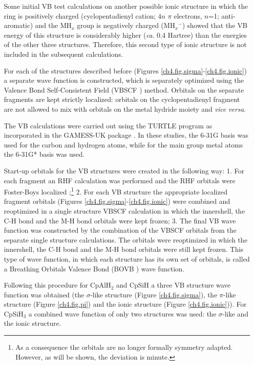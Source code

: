 Some initial VB test calculations on another possible ionic structure in which the ring is positively charged (cyclopentadienyl cation; $4n$ $\pi$ electrons, $n$=1; anti-aromatic) and the MH$_x$ group is negatively charged (MH${_x}{^-}$) showed that the VB energy of this structure is considerably higher (\textit{ca.} 0.4 Hartree) than the energies of the other three structures. Therefore, this second type of ionic structure is not included in the subsequent calculations.

For each of the structures described before (Figures \ref{ch4.fig.sigma}-\ref{ch4.fig.ionic}) a separate wave function is constructed, which is separately optimized using the Valence Bond Self-Consistent Field (VBSCF \cite{vbscf1,vbscf2}) method. Orbitals on the separate fragments are kept strictly localized: orbitals on the cyclopentadienyl fragment are not allowed to mix with orbitals on the metal hydride moiety and \textit{vice versa}.

The VB calculations were carried out using the \mbox{TURTLE} program \cite{turtle} as incorporated in the GAMESS-UK package \cite{gamess}. In these studies, the \mbox{6-31G} basis was used for the carbon and hydrogen atoms, while for the main group metal atoms the 6-31G* basis was used. 

Start-up orbitals for the VB structures were created in the following way: 1. For each fragment an RHF calculation was performed and the RHF orbitals were Foster-Boys localized \cite{foster};\footnote{\label{ch4.foot.consequence}As a consequence the orbitals are no longer formally symmetry adapted. However, as will be shown, the deviation is minute.} 2. For each VB structure the appropriate localized fragment orbitals (Figures \ref{ch4.fig.sigma}-\ref{ch4.fig.ionic}) were combined and reoptimized in a single structure VBSCF calculation in which the innershell, the C-H bond and the M-H bond orbitals were kept frozen; 3. The final VB wave function was constructed by the combination of the VBSCF orbitals from the separate single structure calculations. The orbitals were reoptimized in which the innershell, the C-H bond and the M-H bond orbitals were still kept frozen. This type of wave function, in which each structure has its own set of orbitals, is called a Breathing Orbitals Valence Bond (BOVB \cite{bovb1,bovb2}) wave function. 

Following this procedure  for CpAlH$_2$ and CpSiH a three VB structure wave function was obtained (the $\sigma$-like structure (Figure \ref{ch4.fig.sigma}), the $\pi$-like structure (Figure \ref{ch4.fig.pi}) and the ionic structure (Figure \ref{ch4.fig.ionic})). For CpSiH$_3$ a combined wave function of only two structures was used: the $\sigma$-like and the ionic structure.

